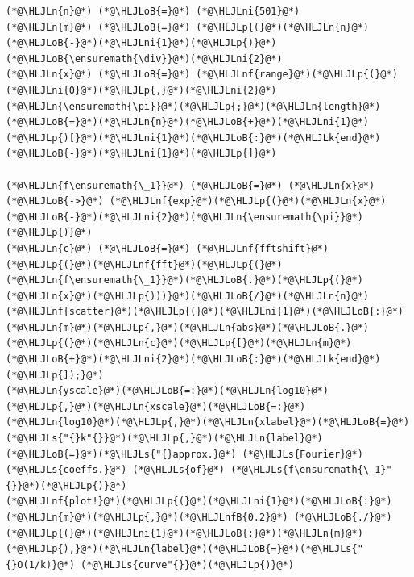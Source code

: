 \documentclass[12pt,landscape]{article}
\newcommand{\HLJLk}[1]{\textcolor[RGB]{148,91,176}{\textbf{#1}}}
\newcommand{\HLJLn}[1]{#1}
\newcommand{\HLJLnf}[1]{\textcolor[RGB]{66,102,213}{#1}}
\newcommand{\HLJLs}[1]{\textcolor[RGB]{201,61,57}{#1}}
\newcommand{\HLJLnfB}[1]{\textcolor[RGB]{59,151,46}{#1}}
\newcommand{\HLJLni}[1]{\textcolor[RGB]{59,151,46}{#1}}
\newcommand{\HLJLoB}[1]{\textcolor[RGB]{102,102,102}{\textbf{#1}}}
\newcommand{\HLJLp}[1]{#1}
\begin{document}
{\begin{lstlisting}
(*@\HLJLn{n}@*) (*@\HLJLoB{=}@*) (*@\HLJLni{501}@*)
(*@\HLJLn{m}@*) (*@\HLJLoB{=}@*) (*@\HLJLp{(}@*)(*@\HLJLn{n}@*)(*@\HLJLoB{-}@*)(*@\HLJLni{1}@*)(*@\HLJLp{)}@*)(*@\HLJLoB{\ensuremath{\div}}@*)(*@\HLJLni{2}@*)
(*@\HLJLn{x}@*) (*@\HLJLoB{=}@*) (*@\HLJLnf{range}@*)(*@\HLJLp{(}@*)(*@\HLJLni{0}@*)(*@\HLJLp{,}@*)(*@\HLJLni{2}@*)(*@\HLJLn{\ensuremath{\pi}}@*)(*@\HLJLp{;}@*)(*@\HLJLn{length}@*)(*@\HLJLoB{=}@*)(*@\HLJLn{n}@*)(*@\HLJLoB{+}@*)(*@\HLJLni{1}@*)(*@\HLJLp{)[}@*)(*@\HLJLni{1}@*)(*@\HLJLoB{:}@*)(*@\HLJLk{end}@*)(*@\HLJLoB{-}@*)(*@\HLJLni{1}@*)(*@\HLJLp{]}@*)

(*@\HLJLn{f\ensuremath{\_1}}@*) (*@\HLJLoB{=}@*) (*@\HLJLn{x}@*) (*@\HLJLoB{->}@*) (*@\HLJLnf{exp}@*)(*@\HLJLp{(}@*)(*@\HLJLn{x}@*)(*@\HLJLoB{-}@*)(*@\HLJLni{2}@*)(*@\HLJLn{\ensuremath{\pi}}@*)(*@\HLJLp{)}@*)
(*@\HLJLn{c}@*) (*@\HLJLoB{=}@*) (*@\HLJLnf{fftshift}@*)(*@\HLJLp{(}@*)(*@\HLJLnf{fft}@*)(*@\HLJLp{(}@*)(*@\HLJLn{f\ensuremath{\_1}}@*)(*@\HLJLoB{.}@*)(*@\HLJLp{(}@*)(*@\HLJLn{x}@*)(*@\HLJLp{)))}@*)(*@\HLJLoB{/}@*)(*@\HLJLn{n}@*)
(*@\HLJLnf{scatter}@*)(*@\HLJLp{(}@*)(*@\HLJLni{1}@*)(*@\HLJLoB{:}@*)(*@\HLJLn{m}@*)(*@\HLJLp{,}@*)(*@\HLJLn{abs}@*)(*@\HLJLoB{.}@*)(*@\HLJLp{(}@*)(*@\HLJLn{c}@*)(*@\HLJLp{[}@*)(*@\HLJLn{m}@*)(*@\HLJLoB{+}@*)(*@\HLJLni{2}@*)(*@\HLJLoB{:}@*)(*@\HLJLk{end}@*)(*@\HLJLp{]);}@*)
(*@\HLJLn{yscale}@*)(*@\HLJLoB{=:}@*)(*@\HLJLn{log10}@*)(*@\HLJLp{,}@*)(*@\HLJLn{xscale}@*)(*@\HLJLoB{=:}@*)(*@\HLJLn{log10}@*)(*@\HLJLp{,}@*)(*@\HLJLn{xlabel}@*)(*@\HLJLoB{=}@*)(*@\HLJLs{"{}k"{}}@*)(*@\HLJLp{,}@*)(*@\HLJLn{label}@*)(*@\HLJLoB{=}@*)(*@\HLJLs{"{}approx.}@*) (*@\HLJLs{Fourier}@*) (*@\HLJLs{coeffs.}@*) (*@\HLJLs{of}@*) (*@\HLJLs{f\ensuremath{\_1}"{}}@*)(*@\HLJLp{)}@*)
(*@\HLJLnf{plot!}@*)(*@\HLJLp{(}@*)(*@\HLJLni{1}@*)(*@\HLJLoB{:}@*)(*@\HLJLn{m}@*)(*@\HLJLp{,}@*)(*@\HLJLnfB{0.2}@*) (*@\HLJLoB{./}@*)(*@\HLJLp{(}@*)(*@\HLJLni{1}@*)(*@\HLJLoB{:}@*)(*@\HLJLn{m}@*)(*@\HLJLp{),}@*)(*@\HLJLn{label}@*)(*@\HLJLoB{=}@*)(*@\HLJLs{"{}O(1/k)}@*) (*@\HLJLs{curve"{}}@*)(*@\HLJLp{)}@*)


\end{lstlisting}}
\end{document}
